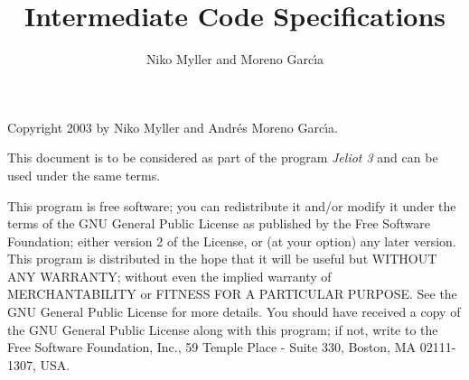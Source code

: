 \documentclass[a4paper, 12pt]{report}
\title{\jel{} Intermediate Code Specifications\\\mcode{}}
\author{Niko Myller and \andres{} Moreno Garc\'{\i}a}
\newcommand{\jel}{Jeliot 3}
\begin{document}

\maketitle
\thispagestyle{empty}

\newpage

\thispagestyle{empty} %
\vfil
Copyright 2003 by Niko Myller and Andr\'{e}s Moreno Garc\'{\i}a.
\bigskip

This document is to be considered as part of the program
\emph{\jel} and can be used under the same terms.
\bigskip

{\small
This program is free software; you can redistribute it and/or
modify it under the terms of the GNU General Public License
as published by the Free Software Foundation; either version 2
of the License, or (at your option) any later version.
This program is distributed in the hope that it will be useful
but WITHOUT ANY WARRANTY; without even the implied warranty of
MERCHANTABILITY or FITNESS FOR A PARTICULAR PURPOSE.
See the GNU General Public License for more details.
You should have received a copy of the GNU General Public License
along with this program; if not, write to the Free Software
Foundation, Inc., 59 Temple Place - Suite 330, Boston, MA
02111-1307, USA.
}

\vfil
\newpage


\thispagestyle{empty} %

\setlength{\parskip}{0ex}

\tableofcontents
\newpage

\setlength{\parskip}{2ex}


\setcounter{page}{1}



\newpage


\newpage



\newpage






\appendix
%

%
\end{document}
